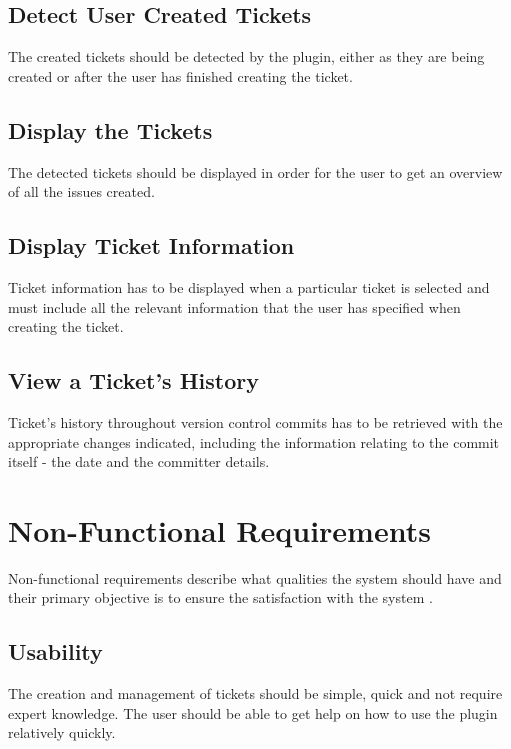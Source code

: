 \documentclass{4thYearProject}
\begin{document}
\subsection{Detect User Created Tickets}

The created tickets should be detected by the plugin, either as they are being created or after the user has finished creating the ticket.

\subsection{Display the Tickets}

The detected tickets should be displayed in order for the user to get an overview of all the issues created.

\subsection{Display Ticket Information}

Ticket information has to be displayed when a particular ticket is selected and must include all the relevant information that the user has specified when creating the ticket.

\subsection{View a Ticket's History}

Ticket's history throughout version control commits has to be retrieved with the appropriate changes indicated, including the information relating to the commit itself - the date and the committer details.

\section{Non-Functional Requirements}

Non-functional requirements describe what qualities the system should have and their primary objective is to ensure the satisfaction with the system \cite{nonfunctional}.

\subsection{Usability}

The creation and management of tickets should be simple, quick and not require expert knowledge. The user should be able to get help on how to use the plugin relatively quickly.
\end{document}
